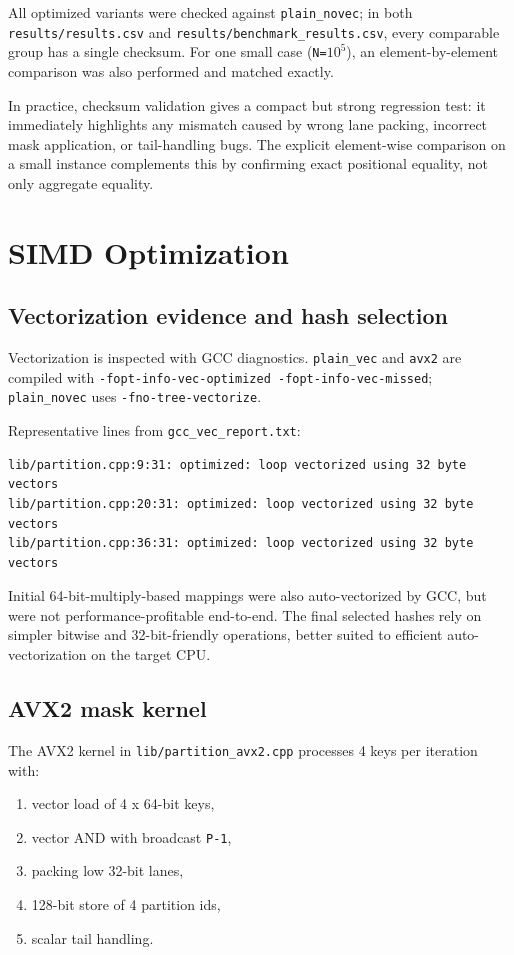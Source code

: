 \documentclass[11pt,a4paper]{article}
\begin{document}
All optimized variants were checked against \texttt{plain\_novec}; in both \texttt{results/results.csv} and \texttt{results/benchmark\_results.csv}, every comparable group has a single checksum. For one small case (\texttt{N=$10^5$}), an element-by-element comparison was also performed and matched exactly.

In practice, checksum validation gives a compact but strong regression test: it immediately highlights any mismatch caused by wrong lane packing, incorrect mask application, or tail-handling bugs. The explicit element-wise comparison on a small instance complements this by confirming exact positional equality, not only aggregate equality.

\section{SIMD Optimization}
\subsection{Vectorization evidence and hash selection}
Vectorization is inspected with GCC diagnostics. \texttt{plain\_vec} and \texttt{avx2} are compiled with \texttt{-fopt-info-vec-optimized -fopt-info-vec-missed}; \texttt{plain\_novec} uses \texttt{-fno-tree-vectorize}.

Representative lines from \texttt{gcc\_vec\_report.txt}:
\begin{verbatim}
lib/partition.cpp:9:31: optimized: loop vectorized using 32 byte vectors
lib/partition.cpp:20:31: optimized: loop vectorized using 32 byte vectors
lib/partition.cpp:36:31: optimized: loop vectorized using 32 byte vectors
\end{verbatim}

Initial 64-bit-multiply-based mappings were also auto-vectorized by GCC, but were not performance-profitable end-to-end. The final selected hashes rely on simpler bitwise and 32-bit-friendly operations, better suited to efficient auto-vectorization on the target CPU.

\subsection{AVX2 mask kernel}
The AVX2 kernel in \texttt{lib/partition\_avx2.cpp} processes 4 keys per iteration with:
\begin{enumerate}
    \item vector load of 4 x 64-bit keys,
    \item vector AND with broadcast \texttt{P-1},
    \item packing low 32-bit lanes,
    \item 128-bit store of 4 partition ids,
    \item scalar tail handling.
\end{enumerate}
\end{document}
